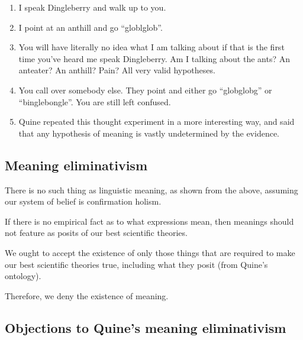 \begin{example}\leavevmode
\begin{enumerate}[label=(\alph*)]
  \item I speak Dingleberry and walk up to you.
  \item I point at an anthill and go ``globlglob''.
  \item You will have literally no idea what I am talking about if that is the first time you've heard me speak Dingleberry. Am I talking about the ants? An anteater? An anthill? Pain? All very valid hypotheses.
  \item You call over somebody else. They point and either go ``globglobg'' or ``binglebongle''. You are still left confused.
  \item Quine repeated this thought experiment in a more interesting way, and said that any hypothesis of meaning is vastly undetermined by the evidence.
\end{enumerate}
\end{example}

\subsection{Meaning eliminativism}

\begin{definition}
There is no such thing as linguistic meaning, as shown from the above, assuming our system of belief is confirmation holism.
\end{definition}

\begin{argument}\leavevmode
\begin{premises}
  \item[P1)] If there is no empirical fact as to what expressions mean, then meanings should not feature as posits of our best scientific theories.
  \item[P2)] We ought to accept the existence of only those things that are required to make our best scientific theories true, including what they posit (from Quine's ontology).
  \item[C2)] Therefore, we deny the existence of meaning.
\end{premises}
\end{argument}

\subsection{Objections to Quine's meaning eliminativism}

